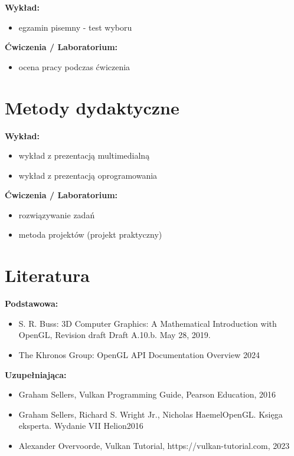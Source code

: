 \documentclass[12pt, a4paper]{article}
\begin{document}
\textbf{Wykład:}
\begin{itemize}
  \item egzamin pisemny - test wyboru
\end{itemize}
\vspace{4pt}
\textbf{Ćwiczenia / Laboratorium:}
\begin{itemize}
  \item ocena pracy podczas ćwiczenia
\end{itemize}


\section{Metody dydaktyczne}

\textbf{Wykład:}
\begin{itemize}
  \item wykład z prezentacją multimedialną
  \item wykład z prezentacją oprogramowania
\end{itemize}
\vspace{4pt}
\textbf{Ćwiczenia / Laboratorium:}
\begin{itemize}
  \item rozwiązywanie zadań
  \item metoda projektów (projekt praktyczny)
\end{itemize}
\vspace{4pt}


\section{Literatura}

\textbf{Podstawowa:}
\begin{itemize}
  \item S. R. Buss: 3D Computer Graphics: A Mathematical Introduction with OpenGL, Revision draft Draft A.10.b. May 28, 2019.
  \item The Khronos Group: OpenGL API Documentation Overview 2024
\end{itemize}

\textbf{Uzupełniająca:}
\begin{itemize}
  \item Graham Sellers, Vulkan Programming Guide, Pearson Education, 2016
  \item Graham Sellers, Richard S. Wright Jr., Nicholas HaemelOpenGL. Księga eksperta. Wydanie VII Helion2016
  \item Alexander Overvoorde, Vulkan Tutorial, https://vulkan-tutorial.com, 2023
\end{itemize}
\end{document}
